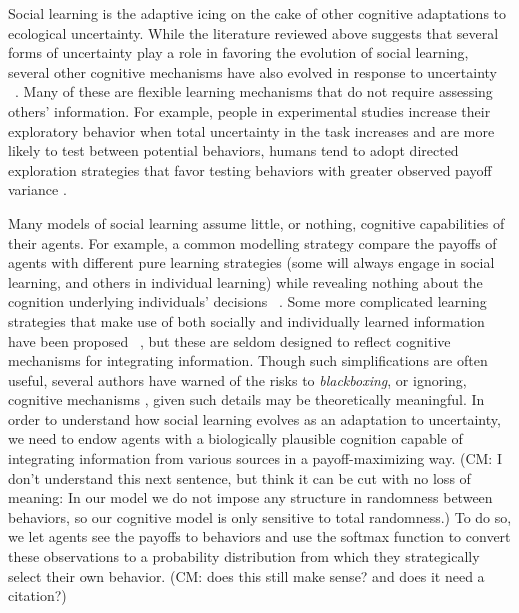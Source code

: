\documentclass[letterpaper,11.5pt]{scrartcl}
\newcommand{\cm}[1]{{\textcolor{mypurple} {({\tiny CM:} #1)}}}
\newcommand{\ps}[1]{{\textcolor{mygreen} {({\tiny PS:} #1)}}}
\begin{document}
Social learning is the adaptive icing on the cake of other cognitive adaptations
to ecological uncertainty.  While the literature reviewed above suggests that
several forms of uncertainty play a role in favoring the evolution of social
learning, several other cognitive mechanisms have also evolved in response to
uncertainty ~\cite{volz2012}. Many of these are flexible learning mechanisms that
do not require assessing others' information. For example, people in experimental
studies increase their exploratory behavior when total uncertainty in the task
increases and are more likely to test %
between potential behaviors, humans tend to adopt directed exploration strategies
that favor testing behaviors with greater observed payoff variance
\cite{Wilson2014,Gershman2019}.

Many models of social learning assume little, or nothing, cognitive capabilities
of their agents. For example, a common modelling strategy compare the payoffs of
agents with different pure learning strategies (some will always engage in social
learning, and others in individual learning) while revealing nothing about the
cognition underlying individuals' decisions  ~\cite{BoydRicherson1985, Rogers1988,
aoki2005}. Some more complicated learning strategies that make use of both
socially and individually learned information have been proposed
~\cite{Enquist2007, perreault2012bayesian}, but these are seldom designed to
reflect cognitive mechanisms for integrating information. Though such
simplifications are often useful, several authors have warned of the risks to
\emph{blackboxing}, or ignoring, cognitive mechanisms \cite[p. 658]{Heyes2016,
Kendal2018}, given such details may be theoretically meaningful. In order to
understand how social learning evolves as an adaptation to uncertainty, we need to
endow agents with a  biologically plausible cognition capable of integrating
information from various sources in a payoff-maximizing way. \cm{I don't
  understand this next sentence, but think it can be cut with no loss of meaning:
  In our model we do not impose any structure in randomness between behaviors, so
our cognitive model is only sensitive to total randomness.} To do so, we let
agents see the payoffs to behaviors and use the softmax function to convert these
observations to a probability distribution from which they strategically select
their own behavior. \cm{does this still make sense? and does it need a citation?}

\end{document}
